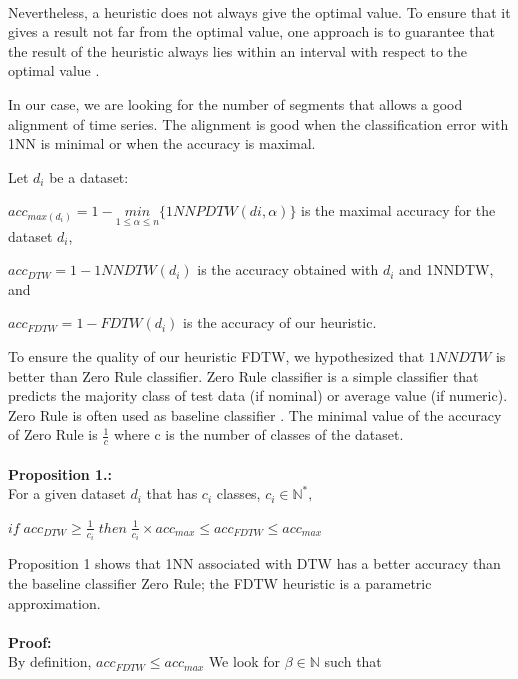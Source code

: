 \paragraph{}Nevertheless, a heuristic does not always give the optimal value. To ensure that
it gives a result not far from the optimal value, one approach is to
 guarantee that the result of the heuristic always lies within an interval with respect to the optimal
value \cite{ibarra1975fast}.

In our case, we are looking for the number of segments that allows a good
alignment of time series. The alignment is good when the classification error
with 1NN is minimal or when the accuracy is maximal.

Let $d_i$ be a dataset: 

$acc_{max(d_i)} = 1-\underset{1\leq\alpha\leq
n}{min}\{1NNPDTW(di,\alpha)\}$ is the maximal accuracy for the dataset $d_i$,

$acc_{DTW} = 1 - 1NNDTW(d_i)$ is the accuracy obtained with $d_i$ and 1NNDTW, and


$acc_{FDTW}=1 - FDTW(d_i)$ is the accuracy of our heuristic.

To ensure the quality of our heuristic FDTW, we hypothesized that $1NNDTW$ is better than
Zero Rule classifier. Zero Rule classifier is a simple classifier that predicts the majority class of test data (if nominal) or average value (if numeric). Zero Rule is often
used as baseline classifier \cite{cuvrin2007meeting}. The minimal value of the
accuracy of Zero Rule is $\frac{1}{c}$ where c is the number of classes of the
dataset.

\paragraph{}\textbf{Proposition 1.:}\\
For a given dataset $d_i$ that has $c_i$ classes, $c_i\in \mathbb{N}^*,$

$
if \; acc_{DTW} \geq \frac{1}{c_i} \; then \;  \frac{1}{c_i} \times acc_{max}
\leq acc_{FDTW} \leq acc_{max}
$

Proposition 1 shows that  1NN associated with DTW has a better accuracy than the baseline
classifier Zero Rule; the FDTW heuristic is a parametric approximation.

\paragraph{}\textbf{Proof: }\\
By definition, $ acc_{FDTW} \leq acc_{max}$ 
We look for $\beta \in \mathbb{N}$ such that 


